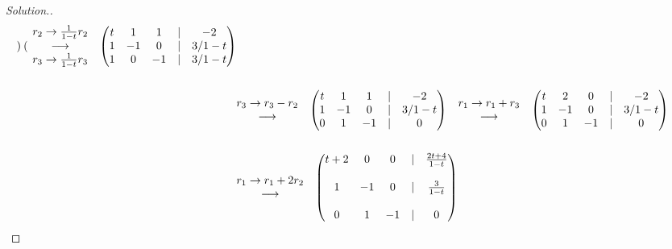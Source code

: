 \documentclass[11pt,a4paper]{article}
\theoremstyle{definition}
\newenvironment{solution}
  {\renewcommand{\qedsymbol}{}\begin{proof}[\textit{Solution}.]}
  {\end{proof}}
\begin{document}
\begin{solution}
\begin{align*}
\begin{pmatrix}
\end{pmatrix}
\hspace{0.3cm}
\begin{matrix}
r_2\rightarrow \frac{1}{1-t}r_2\\ \longrightarrow\\ r_3\rightarrow \frac{1}{1-t}r_3\\
\end{matrix}
\hspace{0.3cm}
\begin{pmatrix}
t&1&1&|&-2\\1&-1&0&|&3/1-t\\1&0&-1&|&3/1-t\\
\end{pmatrix}\\\\
&
\begin{matrix}
r_3\rightarrow r_3-r_2\\ \longrightarrow\\
\end{matrix}
\hspace{0.3cm}
\begin{pmatrix}
t&1&1&|&-2\\1&-1&0&|&3/1-t\\0&1&-1&|&0\\
\end{pmatrix}
\hspace{0.3cm}
\begin{matrix}
r_1\rightarrow r_1+r_3\\ \longrightarrow\\
\end{matrix}
\hspace{0.3cm}
\begin{pmatrix}
t&2&0&|&-2\\1&-1&0&|&3/1-t\\0&1&-1&|&0\\
\end{pmatrix}\\\\
&
\begin{matrix}
r_1\rightarrow r_1+2r_2\\ \longrightarrow\\
\end{matrix}
\hspace{0.3cm}
\begin{pmatrix}
t+2&0&0&|&\frac{2t+4}{1-t}\\\\ 1&-1&0&|&\frac{3}{1-t}\\\\0&1&-1&|&0\\

\end{pmatrix}
\end{align*}
\end{solution}
\end{document}
